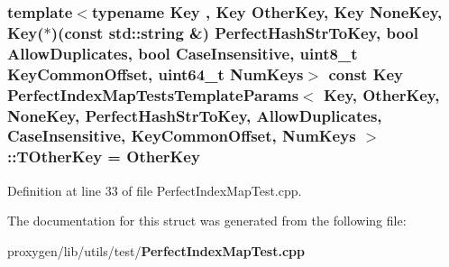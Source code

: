 \subsubsection[{T\+Other\+Key}]{\setlength{\rightskip}{0pt plus 5cm}template$<$typename Key , Key Other\+Key, Key None\+Key, Key($\ast$)(const std\+::string \&) Perfect\+Hash\+Str\+To\+Key, bool Allow\+Duplicates, bool Case\+Insensitive, uint8\+\_\+t Key\+Common\+Offset, uint64\+\_\+t Num\+Keys$>$ const Key {\bf Perfect\+Index\+Map\+Tests\+Template\+Params}$<$ Key, Other\+Key, None\+Key, Perfect\+Hash\+Str\+To\+Key, Allow\+Duplicates, Case\+Insensitive, Key\+Common\+Offset, Num\+Keys $>$\+::T\+Other\+Key = Other\+Key\hspace{0.3cm}{\ttfamily [static]}}\label{structPerfectIndexMapTestsTemplateParams_a08090ca927745238377f0eb11f92a95f}


Definition at line 33 of file Perfect\+Index\+Map\+Test.\+cpp.



The documentation for this struct was generated from the following file\+:\begin{DoxyCompactItemize}
\item 
proxygen/lib/utils/test/{\bf Perfect\+Index\+Map\+Test.\+cpp}\end{DoxyCompactItemize}
